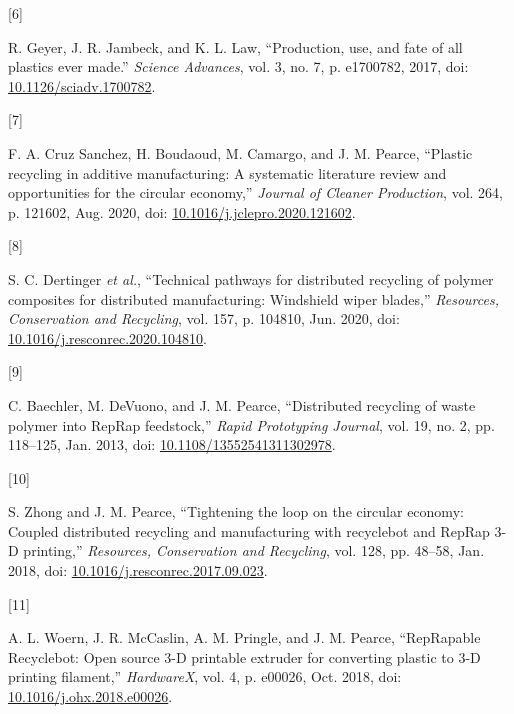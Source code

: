 \documentclass[
]{article}
\newlength{\cslhangindent}
\newlength{\csllabelwidth}
\newlength{\cslentryspacingunit} %
\newenvironment{CSLReferences}[2] %
 {%
  \setlength{\parindent}{0pt}
  \ifodd #1
  \let\oldpar\par
  \def\par{\hangindent=\cslhangindent\oldpar}
  \fi
  \setlength{\parskip}{#2\cslentryspacingunit}
 }%
 {}
\newcommand{\CSLLeftMargin}[1]{\parbox[t]{\csllabelwidth}{#1}}
\newcommand{\CSLRightInline}[1]{\parbox[t]{\linewidth - \csllabelwidth}{#1}\break}
\begin{document}
\begin{CSLReferences}{0}{0}
\leavevmode{}%
\CSLLeftMargin{{[}6{]} }%
\CSLRightInline{R. Geyer, J. R. Jambeck, and K. L. Law, {``Production,
use, and fate of all plastics ever made.''} \emph{Science Advances},
vol. 3, no. 7, p. e1700782, 2017, doi:
\href{https://doi.org/10.1126/sciadv.1700782}{10.1126/sciadv.1700782}.}

\leavevmode{}%
\CSLLeftMargin{{[}7{]} }%
\CSLRightInline{F. A. Cruz Sanchez, H. Boudaoud, M. Camargo, and J. M.
Pearce, {``Plastic recycling in additive manufacturing: {A} systematic
literature review and opportunities for the circular economy,''}
\emph{Journal of Cleaner Production}, vol. 264, p. 121602, Aug. 2020,
doi:
\href{https://doi.org/10.1016/j.jclepro.2020.121602}{10.1016/j.jclepro.2020.121602}.}

\leavevmode{}%
\CSLLeftMargin{{[}8{]} }%
\CSLRightInline{S. C. Dertinger \emph{et al.}, {``Technical pathways for
distributed recycling of polymer composites for distributed
manufacturing: {Windshield} wiper blades,''} \emph{Resources,
Conservation and Recycling}, vol. 157, p. 104810, Jun. 2020, doi:
\href{https://doi.org/10.1016/j.resconrec.2020.104810}{10.1016/j.resconrec.2020.104810}.}

\leavevmode{}%
\CSLLeftMargin{{[}9{]} }%
\CSLRightInline{C. Baechler, M. DeVuono, and J. M. Pearce,
{``Distributed recycling of waste polymer into {RepRap} feedstock,''}
\emph{Rapid Prototyping Journal}, vol. 19, no. 2, pp. 118--125, Jan.
2013, doi:
\href{https://doi.org/10.1108/13552541311302978}{10.1108/13552541311302978}.}

\leavevmode{}%
\CSLLeftMargin{{[}10{]} }%
\CSLRightInline{S. Zhong and J. M. Pearce, {``Tightening the loop on the
circular economy: {Coupled} distributed recycling and manufacturing with
recyclebot and {RepRap} 3-{D} printing,''} \emph{Resources, Conservation
and Recycling}, vol. 128, pp. 48--58, Jan. 2018, doi:
\href{https://doi.org/10.1016/j.resconrec.2017.09.023}{10.1016/j.resconrec.2017.09.023}.}

\leavevmode{}%
\CSLLeftMargin{{[}11{]} }%
\CSLRightInline{A. L. Woern, J. R. McCaslin, A. M. Pringle, and J. M.
Pearce, {``{RepRapable Recyclebot}: {Open} source 3-{D} printable
extruder for converting plastic to 3-{D} printing filament,''}
\emph{HardwareX}, vol. 4, p. e00026, Oct. 2018, doi:
\href{https://doi.org/10.1016/j.ohx.2018.e00026}{10.1016/j.ohx.2018.e00026}.}


\end{CSLReferences}
\end{document}
